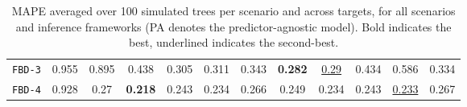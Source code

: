 \begin{landscape}
\begin{table}[h!]
\begin{tabular}{cccccccccccc}
            \texttt{FBD-3}    & 0.955 & 0.895 & 0.438 & 0.305 & 0.311 & 0.343 & \textbf{0.282} & \underline{0.29} & 0.434 & 0.586 & 0.334 \\[6pt]

            \texttt{FBD-4}    & 0.928     & 0.27     & \textbf{0.218}     & 0.243     & 0.234     & 0.266     & 0.249     & 0.234     & 0.243     & \underline{0.233}     & 0.267     \\[6pt]

            \bottomrule
        \end{tabular}
        \caption{MAPE averaged over 100 simulated trees per scenario and across targets, for all scenarios and inference frameworks (PA denotes the predictor-agnostic model). Bold indicates the best, underlined indicates the second-best.}%
        \label{tab:mape}
    \end{table}
\end{landscape}
